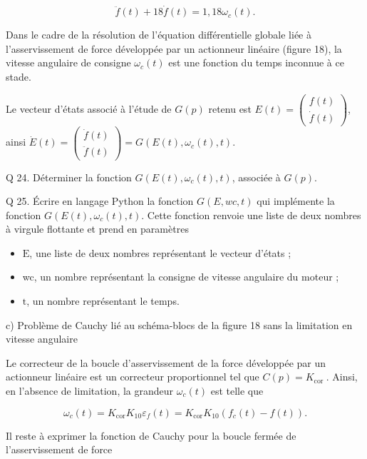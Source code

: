 \documentclass[10pt]{article}
\begin{document}
$$
\ddot{f}(t)+18 \dot{f}(t)=1,18 \omega_{c}(t) .
$$

Dans le cadre de la résolution de l'équation différentielle globale liée à l'asservissement de force développée par un actionneur linéaire (figure 18), la vitesse angulaire de consigne $\omega_{c}(t)$ est une fonction du temps inconnue à ce stade.

Le vecteur d'états associé à l'étude de $G(p)$ retenu est $E(t)=\left(\begin{array}{c}f(t) \\ \dot{f}(t)\end{array}\right)$, ainsi $\dot{E}(t)=\left(\begin{array}{l}\dot{f}(t) \\ \ddot{f}(t)\end{array}\right)=G\left(E(t), \omega_{c}(t), t\right)$.

Q 24. Déterminer la fonction $G\left(E(t), \omega_{c}(t), t\right)$, associée à $G(p)$.

Q 25. Écrire en langage Python la fonction $G(E, w c, t)$ qui implémente la fonction $G\left(E(t), \omega_{c}(t), t\right)$. Cette fonction renvoie une liste de deux nombres à virgule flottante et prend en paramètres

\begin{itemize}
  \item $\mathrm{E}$, une liste de deux nombres représentant le vecteur d'états ;

  \item wc, un nombre représentant la consigne de vitesse angulaire du moteur ;

  \item $\mathrm{t}$, un nombre représentant le temps.

\end{itemize}

c) Problème de Cauchy lié au schéma-blocs de la figure 18 sans la limitation en vitesse angulaire

Le correcteur de la boucle d'asservissement de la force développée par un actionneur linéaire est un correcteur proportionnel tel que $C(p)=K_{\text {cor }}$. Ainsi, en l'absence de limitation, la grandeur $\omega_{c}(t)$ est telle que

$$
\omega_{c}(t)=K_{\mathrm{cor}} K_{10} \varepsilon_{f}(t)=K_{\mathrm{cor}} K_{10}\left(f_{c}(t)-f(t)\right) .
$$

Il reste à exprimer la fonction de Cauchy pour la boucle fermée de l'asservissement de force
\end{document}
